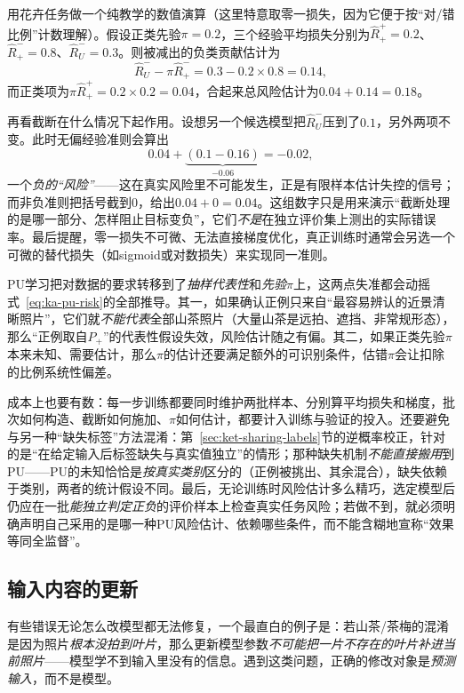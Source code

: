 用花卉任务做一个纯教学的数值演算（这里特意取零一损失，因为它便于按“对/错比例”计数理解）。假设正类先验$\pi=0.2$，三个经验平均损失分别为$\widehat R_+^+=0.2$、$\widehat R_+^-=0.8$、$\widehat R_U^-=0.3$。则被减出的负类贡献估计为
\[
  \widehat R_U^--\pi\widehat R_+^-=0.3-0.2\times0.8=0.14,
\]
而正类项为$\pi\widehat R_+^+=0.2\times0.2=0.04$，合起来总风险估计为$0.04+0.14=0.18$。

再看截断在什么情况下起作用。设想另一个候选模型把$\widehat R_U^-$压到了$0.1$，另外两项不变。此时无偏经验准则会算出
\[
  0.04+\underbrace{(0.1-0.16)}_{-0.06}=-0.02,
\]
一个\emph{负的“风险”}——这在真实风险里不可能发生，正是有限样本估计失控的信号；而非负准则把括号截到0，给出$0.04+0=0.04$。这组数字只是用来演示“截断处理的是哪一部分、怎样阻止目标变负”，它们\emph{不是}在独立评价集上测出的实际错误率。最后提醒，零一损失不可微、无法直接梯度优化，真正训练时通常会另选一个可微的替代损失（如sigmoid或对数损失）来实现同一准则。

PU学习把对数据的要求转移到了\emph{抽样代表性}和\emph{先验$\pi$}上，这两点失准都会动摇式~\eqref{eq:ka-pu-risk}的全部推导。其一，如果确认正例只来自“最容易辨认的近景清晰照片”，它们就\emph{不能代表}全部山茶照片（大量山茶是远拍、遮挡、非常规形态），那么“正例取自$P_+$”的代表性假设失效，风险估计随之有偏。其二，如果正类先验$\pi$本来未知、需要估计，那么$\pi$的估计还要满足额外的可识别条件，估错$\pi$会让扣除的比例系统性偏差。

成本上也要有数：每一步训练都要同时维护两批样本、分别算平均损失和梯度，批次如何构造、截断如何施加、$\pi$如何估计，都要计入训练与验证的投入。还要避免与另一种“缺失标签”方法混淆：第~\ref{sec:ket-sharing-labels}节的逆概率校正，针对的是“在给定输入后标签缺失与真实值独立”的情形；那种缺失机制\emph{不能直接搬用}到PU——PU的未知恰恰是\emph{按真实类别}区分的（正例被挑出、其余混合），缺失依赖于类别，两者的统计假设不同。最后，无论训练时风险估计多么精巧，选定模型后仍应在一批\emph{能独立判定正负}的评价样本上检查真实任务风险；若做不到，就必须明确声明自己采用的是哪一种PU风险估计、依赖哪些条件，而不能含糊地宣称“效果等同全监督”。

\subsection{输入内容的更新}
\label{sec:knowledge-acquisition-input-update}

有些错误无论怎么改模型都无法修复，一个最直白的例子是：若山茶/茶梅的混淆是因为照片\emph{根本没拍到叶片}，那么更新模型参数\emph{不可能把一片不存在的叶片补进当前照片}——模型学不到输入里没有的信息。遇到这类问题，正确的修改对象是\emph{预测输入}，而不是模型。

